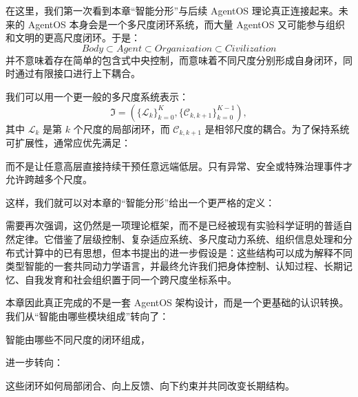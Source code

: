 在这里，我们第一次看到本章“智能分形”与后续 AgentOS 理论真正连接起来。未来的 AgentOS 本身会是一个多尺度闭环系统，而大量 AgentOS 又可能参与组织和文明的更高尺度闭环。于是：
\[
Body
\subset
Agent
\subset
Organization
\subset
Civilization
\]
并不意味着存在简单的包含式中央控制，而意味着不同尺度分别形成自身闭环，同时通过有限接口进行上下耦合。

我们可以用一个更一般的多尺度系统表示：
\[
\mathfrak{I}
=
\left(
\{\mathcal L_k\}_{k=0}^{K},
\{\mathcal C_{k,k+1}\}_{k=0}^{K-1}
\right),
\]
其中 $\mathcal L_k$ 是第 $k$ 个尺度的局部闭环，而 $\mathcal C_{k,k+1}$ 是相邻尺度的耦合。为了保持系统可扩展性，通常应优先满足：
\begin{statementbox}
\centering
{}
\end{statementbox}
而不是让任意高层直接持续干预任意远端低层。只有异常、安全或特殊治理事件才允许跨越多个尺度。

这样，我们就可以对本章的“智能分形”给出一个更严格的定义：

\begin{statementbox}
\centering
{}
\end{statementbox}

需要再次强调，这仍然是一项理论框架，而不是已经被现有实验科学证明的普适自然定律。它借鉴了层级控制、复杂适应系统、多尺度动力系统、组织信息处理和分布式计算中的已有思想，但本书提出的进一步假设是：这些结构可以成为解释不同类型智能的一套共同动力学语言，并最终允许我们把身体控制、认知过程、长期记忆、自我发育和社会组织置于同一个跨尺度坐标系中。

本章因此真正完成的不是一套 AgentOS 架构设计，而是一个更基础的认识转换。我们从“智能由哪些模块组成”转向了：

\begin{statementbox}
智能由哪些不同尺度的闭环组成，
\end{statementbox}
进一步转向：
\begin{statementbox}
这些闭环如何局部闭合、向上反馈、向下约束并共同改变长期结构。
\end{statementbox}

